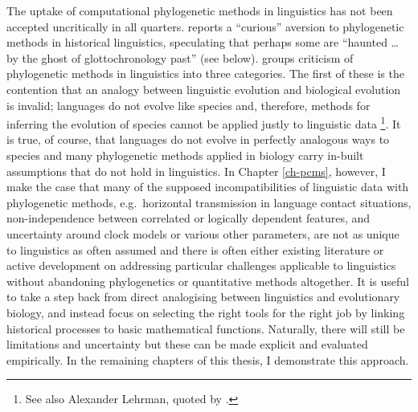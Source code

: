 The uptake of computational phylogenetic methods in linguistics has not been accepted uncritically in all quarters. \textcite[p.~520]{atkinson_curious_2005} reports a ``curious'' aversion to phylogenetic methods in historical linguistics, speculating that perhaps some are ``haunted \ldots{} by the ghost of glottochronology past'' (see below). \textcite{bowern_computational_2018} groups criticism of phylogenetic methods in linguistics into three categories. The first of these is the contention that an analogy between linguistic evolution and biological evolution is invalid; languages do not evolve like species and, therefore, methods for inferring the evolution of species cannot be applied justly to linguistic data \autocites{andersen_synchrony_2006}{blench_new_2015}\footnote{See also Alexander Lehrman, quoted by \textcite[p.~1326]{balter_search_2004}.}. It is true, of course, that languages do not evolve in perfectly analogous ways to species and many phylogenetic methods applied in biology carry in-built assumptions that do not hold in linguistics. In Chapter \ref{ch-pcms}, however, I make the case that many of the supposed incompatibilities of linguistic data with phylogenetic methods, e.g.~horizontal transmission in language contact situations, non-independence between correlated or logically dependent features, and uncertainty around clock models or various other parameters, are not as unique to linguistics as often assumed and there is often either existing literature or active development on addressing particular challenges applicable to linguistics without abandoning phylogenetics or quantitative methods altogether. It is useful to take a step back from direct analogising between linguistics and evolutionary biology, and instead focus on selecting the right tools for the right job by linking historical processes to basic mathematical functions. Naturally, there will still be limitations and uncertainty but these can be made explicit and evaluated empirically. In the remaining chapters of this thesis, I demonstrate this approach.

